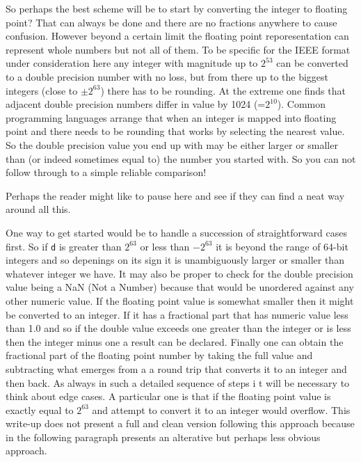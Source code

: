So perhaps the best scheme will be to start by converting the integer
to floating point? That can always be done and there are no fractions
anywhere to cause confusion. However beyond a certain limit the floating
point reporesentation can represent whole numbers but not all of them. To
be specific for the IEEE format under consideration here any integer
with magnitude up to $2^{53}$ can be converted to a double precision number
with no loss, but from there up to the biggest integers (close to $\pm 2^{63}$)
there has to be rounding. At the extreme one finds that adjacent double
precision numbers differ in value by 1024 (=$2^{10}$). Common programming
languages arrange that when an integer is mapped into floating point and
there needs to be rounding that works by selecting the nearest value.
So the double precision value you end up with may be either larger or
smaller than (or indeed sometimes equal to) the number you started with.
So you can not follow through to a simple reliable comparison!

Perhaps the reader might like to pause here and see if they can find
a neat way around all this.

One way to get started would be to handle a succession of straightforward
cases first. So if \verb+d+ is greater than $2^{63}$ or less than $-2^{63}$ it
is beyond the range of 64-bit integers and so depenings on its sign it
is unambiguously larger or smaller than whatever integer we have. It may
also be proper to check for the double precision value being a NaN (Not a
Number) because that would be unordered against any other numeric value.
If the floating point value is somewhat smaller then it might be converted
to an integer. If it has a fractional part that has numeric value less than
1.0 and so if the double value exceeds one greater than the integer or
is less then the integer minus one a result can be declared. Finally
one can obtain the fractional part of the floating point number by taking
the full value and subtracting what emerges from a a round trip that
converts it to an integer and then back. As always in such a detailed sequence
of steps i t will be necessary to think about edge cases. A particular one
is that if the floating point value is exactly equal to $2^{63}$ and attempt to
convert it to an integer would overflow. This write-up does not present a
full and clean version following this approach because in the following
paragraph presents an alterative but perhaps less obvious approach.

